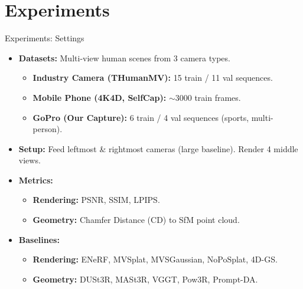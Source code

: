 \section{Experiments}
\begin{frame}{Experiments: Settings}
    \begin{itemize}
        \item \textbf{Datasets:} Multi-view human scenes from 3 camera types.
        \begin{itemize}
            \item \textbf{Industry Camera (THumanMV):} 15 train / 11 val sequences.
            \item \textbf{Mobile Phone (4K4D, SelfCap):} $\sim$3000 train frames.
            \item \textbf{GoPro (Our Capture):} 6 train / 4 val sequences (sports, multi-person).
        \end{itemize}
        \item \textbf{Setup:} Feed leftmost \& rightmost cameras (large baseline). Render 4 middle views.
        \item \textbf{Metrics:}
        \begin{itemize}
            \item \textbf{Rendering:} PSNR, SSIM, LPIPS.
            \item \textbf{Geometry:} Chamfer Distance (CD) to SfM point cloud.
        \end{itemize}
        \item \textbf{Baselines:}
        \begin{itemize}
            \item \textbf{Rendering:} ENeRF, MVSplat, MVSGaussian, NoPoSplat, 4D-GS.
            \item \textbf{Geometry:} DUSt3R, MASt3R, VGGT, Pow3R, Prompt-DA.
        \end{itemize}
    \end{itemize}
\end{frame}

